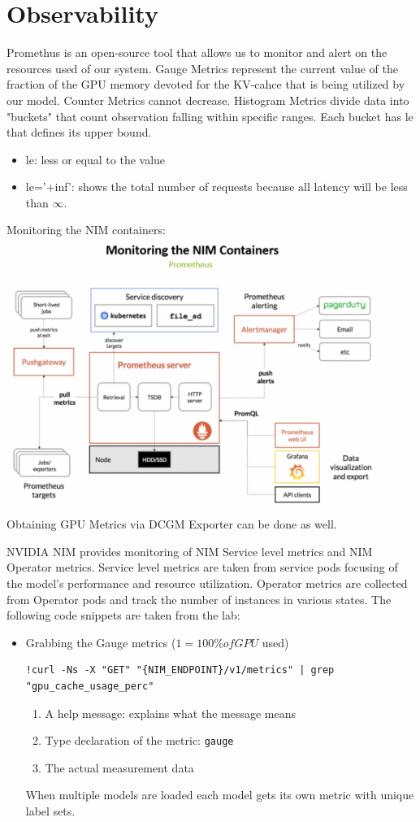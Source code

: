 \documentclass{article}
\begin{document}
\section{Observability}
Promethus is an open-source tool that allows us to monitor and alert on the resources used of our system. 
Gauge Metrics represent the current value of the fraction of the GPU memory devoted for the KV-cahce that is being utilized by our model.
Counter Metrics cannot decrease. 
Histogram Metrics divide data into "buckets" that count observation falling within specific ranges. Each bucket has le that defines its upper bound. 
\begin{itemize}
    \item le: less or equal to the value
    \item le='+inf': shows the total number of requests because all latency will be less than $\infty$. 
\end{itemize}
Monitoring the NIM containers: \\\includegraphics[width=0.9\textwidth]{../images/archPromethus.png}\\
Obtaining GPU Metrics via DCGM Exporter can be done as well. 

NVIDIA NIM provides monitoring of NIM Service level metrics and NIM Operator metrics. Service level metrics are taken from service pods focusing of the model's performance and resource utilization. Operator metrics are collected from Operator pods and track the number of instances in various states. The following code snippets are taken from the lab: 
\begin{itemize}
    \item Grabbing the Gauge metrics ($1 = 100\% of GPU$ used)
    \begin{verbatim}
!curl -Ns -X "GET" "{NIM_ENDPOINT}/v1/metrics" | grep "gpu_cache_usage_perc"
    \end{verbatim}
    \begin{enumerate}
        \item A help message: explains what the message means
        \item Type declaration of the metric: \verb|gauge|
        \item The actual measurement data
    \end{enumerate}
    When multiple models are loaded each model gets its own metric with unique label sets. 
\end{itemize}
\end{document}
